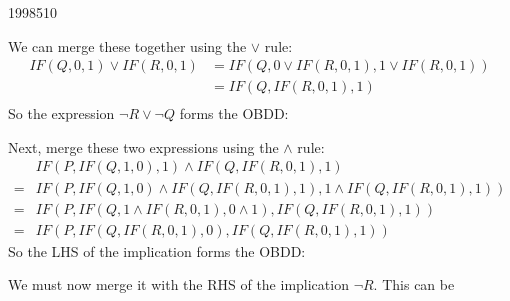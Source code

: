 \documentclass[10pt,\jkfside,a4paper]{article}
\begin{document}
\begin{examquestion}{1998}{5}{10}
\begin{enumerate}
\begin{center}
\hspace{1cm}
\end{center}
We can merge these together using the $\vee$ rule:
\begin{align*}
IF(Q, 0, 1) \vee IF(R, 0, 1)
&= IF(Q, 0 \vee IF(R, 0, 1), 1 \vee IF(R, 0, 1)) \\
&= IF(Q, IF(R, 0, 1), 1) \\
\end{align*}
So the expression $\neg R \vee \neg Q$ forms the OBDD:
\begin{center}
\end{center}
Next, merge these two expressions using the $\wedge$ rule:
\begin{align*}
 & IF(P, IF(Q, 1, 0), 1) \wedge IF(Q, IF(R, 0, 1), 1) \\
=& IF(P, IF(Q, 1, 0) \wedge IF(Q, IF(R, 0, 1), 1), 1 \wedge IF(Q, IF(R, 0,
1), 1)) \\
=& IF(P, IF(Q, 1 \wedge IF(R, 0, 1), 0 \wedge 1), IF(Q, IF(R, 0, 1), 1)) \\
=& IF(P, IF(Q, IF(R, 0, 1), 0), IF(Q, IF(R, 0, 1), 1))
\end{align*}
So the LHS of the implication forms the OBDD:
\begin{center}
\end{center}
We must now merge it with the RHS of the implication $\neg R$. This can be

\end{enumerate}
\end{examquestion}
\end{document}
